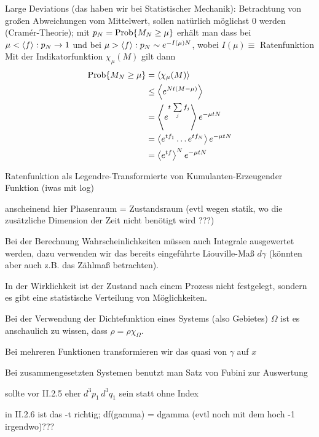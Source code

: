 \documentclass[../KlassMech_main.tex]{subfiles}
\begin{document}
Large Deviations (das haben wir bei Statistischer Mechanik): Betrachtung von großen Abweichungen vom Mittelwert, sollen natürlich möglichst 0 werden (Cramér-Theorie); mit $p_N = \text{Prob}\qty{M_N \geq \mu}$ erhält man dass bei $\mu < \expval{f}: p_N \rightarrow 1$ und bei $\mu > \expval{f}: p_N \sim e^{-I(\mu) N}$, wobei $I(\mu) \equiv$ Ratenfunktion
Mit der Indikatorfunktion $\chi_\mu(M)$ gilt dann
\begin{align}\label{key}
\text{Prob}\qty{M_N \geq \mu} &= \expval{ \chi_\mu(M)}
\notag\\
&\leq \expval{e^{N t (M - \mu)}}
\notag\\
&= \expval{e^{t \, \sum\limits_j f_j}} e^{-\mu t N}
\notag\\
&= \expval{e^{t f_1} \dots e^{t f_N}} e^{-\mu t N}
\notag\\
&= \expval{e^{t f}}^N e^{-\mu t N}
\end{align}

Ratenfunktion als Legendre-Transformierte von Kumulanten-Erzeugender Funktion (iwas mit log)



anscheinend hier Phasenraum = Zustandsraum (evtl wegen statik, wo die zusätzliche Dimension der Zeit nicht benötigt wird ???)

Bei der Berechnung Wahrscheinlichkeiten müssen auch Integrale ausgewertet werden, dazu verwenden wir das bereits eingeführte Liouville-Maß $d\gamma$ (könnten aber auch z.B. das Zählmaß betrachten).

In der Wirklichkeit ist der Zustand nach einem Prozess nicht festgelegt, sondern es gibt eine statistische Verteilung von Möglichkeiten.

Bei der Verwendung der Dichtefunktion eines Systems (also Gebietes) $\Omega$ ist es anschaulich zu wissen, dass $\rho = \rho \chi_\Omega$. %

Bei mehreren Funktionen transformieren wir das quasi von $\gamma$ auf $x$

Bei zusammengesetzten Systemen benutzt man Satz von Fubini zur Auswertung

sollte vor II.2.5 eher $d^3p_1 \, d^3q_1$ sein statt ohne Index

in II.2.6 ist das -t richtig; df(gamma) = dgamma (evtl noch mit dem hoch -1 irgendwo)???
\end{document}
